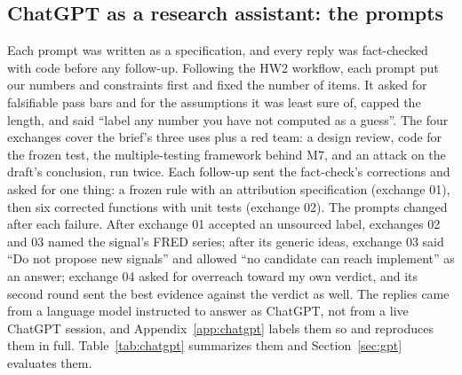 \subsection{ChatGPT as a research assistant: the prompts}
\label{sec:prompts}

Each prompt was written as a specification, and every reply was fact-checked with code before any follow-up. Following the HW2 workflow, each prompt put our numbers and constraints first and fixed the number of items. It asked for falsifiable pass bars and for the assumptions it was least sure of, capped the length, and said ``label any number you have not computed as a guess''. The four exchanges cover the brief's three uses plus a red team: a design review, code for the frozen test, the multiple-testing framework behind M7, and an attack on the draft's conclusion, run twice. Each follow-up sent the fact-check's corrections and asked for one thing: a frozen rule with an attribution specification (exchange 01), then six corrected functions with unit tests (exchange 02). The prompts changed after each failure. After exchange 01 accepted an unsourced label, exchanges 02 and 03 named the signal's FRED series; after its generic ideas, exchange 03 said ``Do not propose new signals'' and allowed ``no candidate can reach implement'' as an answer; exchange 04 asked for overreach toward my own verdict, and its second round sent the best evidence against the verdict as well. The replies came from a language model instructed to answer as ChatGPT, not from a live ChatGPT session, and Appendix~\ref{app:chatgpt} labels them so and reproduces them in full. Table~\ref{tab:chatgpt} summarizes them and Section~\ref{sec:gpt} evaluates them.


